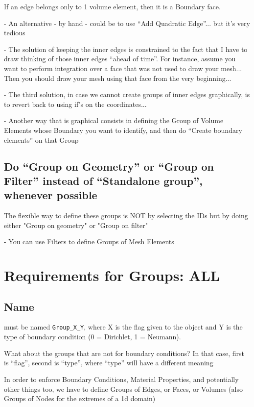 \documentclass[10pt]{book}
\begin{document}
 If an edge belongs only to 1 volume element, then it is a Boundary face.
 
 
 - An alternative - by hand - could be to use ``Add Quadratic Edge''... but it's very tedious
 
 - The solution of keeping the inner edges is constrained to the fact 
   that I have to draw thinking of those inner edges ``ahead of time''.
   For instance, assume you want to perform integration over a face 
   that was not used to draw your mesh... 
   Then you should draw your mesh using that face from the very beginning...
   
 - The third solution, in case we cannot create groups of inner edges graphically,
    is to revert back to using if's on the coordinates...  
 
 - Another way that is graphical consists in defining the Group of Volume Elements
 whose Boundary you want to identify,
 and then do ``Create boundary elements'' on that Group
 
 
 \subsection{Do ``Group on Geometry'' or ``Group on Filter'' instead of ``Standalone group'',
          whenever possible}
          
    The flexible way to define these groups is NOT by selecting the IDs but by doing either "Group on geometry" or "Group on filter"

- You can use Filters to define Groups of Mesh Elements

        
          
\section{Requirements for Groups: ALL}


\subsection{Name}

  must be named \verb|Group_X_Y|, where X is the flag given to the object and Y is the type of boundary condition (0 = Dirichlet, 1 = Neumann).
  
  
  What about the groups that are not for boundary conditions? In that case, first is ``flag'', second is ``type'', where ``type'' will have
  a different meaning

  In order to enforce Boundary Conditions, Material Properties, and potentially other things too,
  we have to define Groups of Edges, or Faces, or Volumes (also Groups of Nodes for the extremes of a 1d domain)
  
\end{document}
